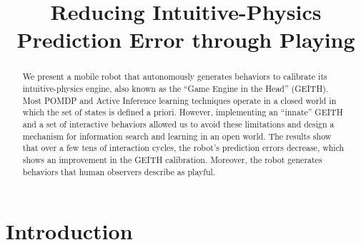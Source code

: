 \documentclass[runningheads]{llncs}
\begin{document}
%
\title{Reducing Intuitive-Physics Prediction Error through Playing}
%
%



%
\maketitle              %
%
\begin{abstract}
We present a mobile robot that autonomously generates behaviors to calibrate its intuitive-physics engine, also known as the ``Game Engine in the Head'' (GEITH).
Most POMDP and Active Inference learning techniques operate in a closed world in which the set of states is defined a priori. 
However, implementing an ``innate'' GEITH and a set of interactive behaviors allowed us to avoid these limitations and design a mechanism for information search and learning in an open world. 
The results show that over a few tens of interaction cycles, the robot's prediction errors decrease, which shows an improvement in the GEITH calibration. 
Moreover, the robot generates behaviors that human observers describe as playful.

\end{abstract}
%
%
%
\section{Introduction}
\label{sec:intro}
\end{document}
